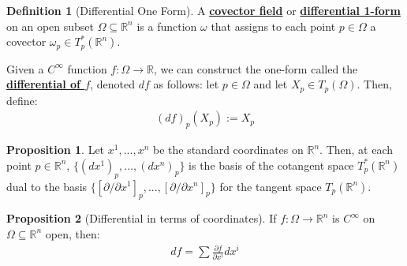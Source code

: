 \documentclass[11pt]{scrartcl}
\newcommand{\R}[0]{\mathbb{R}}
\theoremstyle{definition}
\newtheorem{definition}{Definition}
\newtheorem{prop}{Proposition}
\theoremstyle{remark}
\newcommand{\dfn}[1]{\textbf{\underline{#1}}}
\begin{document}
{\begin{definition}[Differential One Form]
	A \dfn{covector field} or \dfn{differential 1-form} on an open subset $\Omega \subseteq \R^n$ is a function $\omega$ that assigns to each point $p \in \Omega$ a covector $\omega_p \in T_p^*(\R^n)$. 
\end{definition}
Given a $C^\infty$ function $f: \Omega \rightarrow \R$, we can construct the one-form called the \dfn{differential of $f$}, denoted $df$ as follows: let $p \in \Omega$ and let $X_p \in T_p(\Omega)$. Then, define: 
\begin{align*}
	(df)_p (X_p) := X_p 
\end{align*}

\begin{prop}
	Let $x^1, ..., x^n$ be the standard coordinates on $\R^n$. Then, at each point $p \in \R^n$, $\{ (dx^1)_p, ..., (dx^n)_p \}$ is the basis of the cotangent space $T_p^*(\R^n)$ dual to the basis $\{ [\partial/\partial x^1]_p, ..., [\partial / \partial x^n]_p \}$ for the tangent space $T_p(\R^n)$. 
\end{prop}

\begin{prop}[Differential in terms of coordinates]
	If $f: \Omega \rightarrow \R^n$ is $C^\infty$ on $\Omega \subseteq \R^n$ open, then: 
	\begin{align*}
		df = \sum \frac{\partial f}{\partial x^i} dx^i
	\end{align*}
\end{prop}

}
\end{document}
